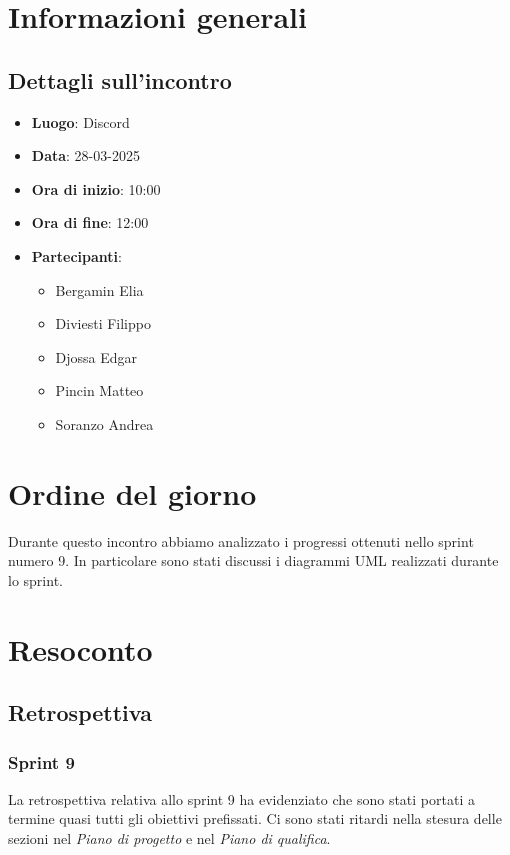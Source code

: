 \section{Informazioni generali}
\subsection{Dettagli sull'incontro}
\begin{itemize}
    \item \textbf{Luogo}: Discord
    \item \textbf{Data}: 28-03-2025
    \item \textbf{Ora di inizio}: 10:00
    \item \textbf{Ora di fine}: 12:00
    \item \textbf{Partecipanti}:
    \begin{itemize}
        \item Bergamin Elia
        \item Diviesti Filippo
        \item Djossa Edgar
        \item Pincin Matteo 
        \item Soranzo Andrea  
    \end{itemize}
\end{itemize}

\section{Ordine del giorno}
Durante questo incontro abbiamo analizzato i progressi ottenuti nello sprint numero 9.
In particolare sono stati discussi i diagrammi UML realizzati durante lo sprint.
\section{Resoconto}
\subsection{Retrospettiva}
\subsubsection{Sprint 9}
La retrospettiva relativa allo sprint 9 ha evidenziato che sono stati portati a termine quasi tutti gli obiettivi prefissati.
Ci sono stati ritardi nella stesura delle sezioni nel \textit{Piano di progetto} e nel \textit{Piano di qualifica}.

